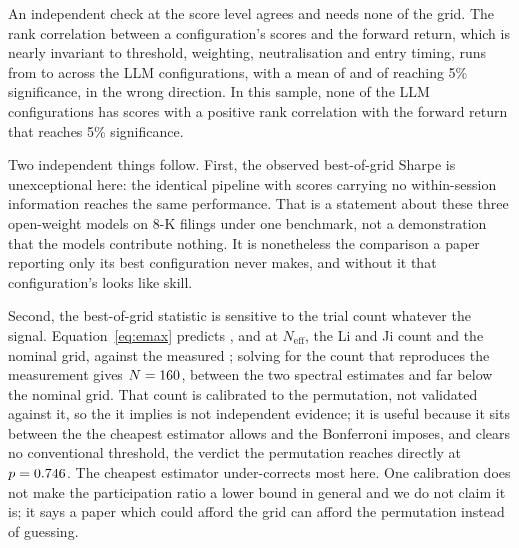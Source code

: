 \documentclass[sigconf]{acmart}
\begin{document}
An independent check at the score level agrees and needs none of the grid. The rank correlation
between a configuration's scores and the forward return, which is nearly invariant to threshold,
weighting, neutralisation and entry timing, runs from \ICMin{} to \ICMax{} across the
\ICNumConfigs{} LLM configurations, with a mean of \ICMean{} and \ICNumSig{} of \ICNumConfigs{}
reaching 5\% significance, in the wrong direction. In this sample, none of the \ICNumConfigs{} LLM
configurations has scores with a positive rank correlation with the forward return that reaches 5\%
significance.

Two independent things follow. First, the observed best-of-grid Sharpe is unexceptional here: the
identical pipeline with scores carrying no within-session information reaches the same performance.
That is a statement about these three open-weight models on 8-K filings under one benchmark, not a
demonstration that the models contribute nothing. It is nonetheless the comparison a paper reporting
only its best configuration never makes, and without it that configuration's \SharpeBest{} looks
like skill.

Second, the best-of-grid statistic is sensitive to the trial count whatever the signal.
Equation~\eqref{eq:emax} predicts \EmaxNeff{}, \EmaxLiJi{} and \EmaxFull{} at $N_{\mathrm{eff}}$,
the Li and Ji count and the nominal grid, against the measured \EmaxMeasured{}; solving for the
count that reproduces the measurement gives $N=160{}$, between the two spectral estimates
and far below the nominal grid. That count is calibrated to the permutation, not validated
against it, so the \DSRimplied{} it implies is not independent evidence; it is useful because it
sits between the \DSRneff{} the cheapest estimator allows and the \DSRfull{} Bonferroni imposes, and
clears no conventional threshold, the verdict the permutation reaches directly at
$p=0.746{}$. The cheapest estimator under-corrects most
here. One
calibration does not make the participation ratio a lower bound in general and we do not claim it
is; it says a paper which could afford the grid can afford the permutation instead of guessing.
\end{document}
